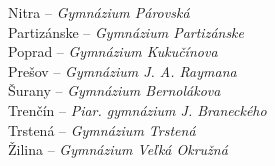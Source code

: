 {\begin{multicols}{2}
\columnbreak

\noindent
Nitra -- {\it Gymnázium Párovská} \\
Partizánske -- {\it Gymnázium Partizánske} \\
Poprad -- {\it Gymnázium Kukučínova} \\
Prešov -- {\it Gymnázium J. A. Raymana} \\
Šurany -- {\it Gymnázium Bernolákova} \\
Trenčín -- {\it Piar. gymnázium J. Braneckého} \\
Trstená -- {\it Gymnázium Trstená} \\
Žilina -- {\it Gymnázium Veľká Okružná}
\end{multicols}
}%
